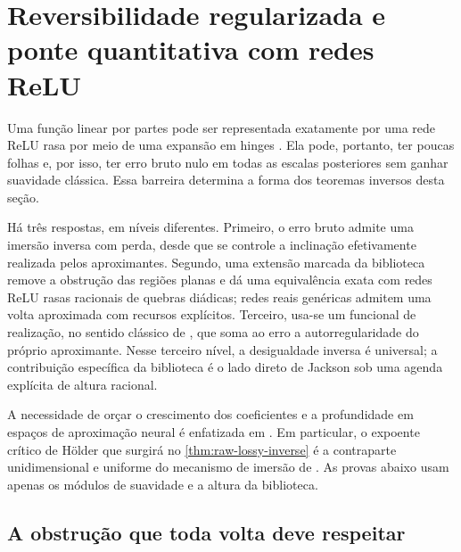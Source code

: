 \section{Reversibilidade regularizada e ponte quantitativa com redes ReLU}
\label{sec:regularized-reversibility}

Uma função linear por partes pode ser representada exatamente por uma rede ReLU
rasa por meio de uma expansão em hinges
\citep{devorehaninpetrova2021,daubechies2022}. Ela pode, portanto, ter poucas
folhas e, por isso, ter erro bruto nulo em todas as escalas posteriores sem
ganhar suavidade clássica. Essa barreira determina a forma dos teoremas
inversos desta seção.

Há três respostas, em níveis diferentes. Primeiro, o erro bruto admite uma
imersão inversa com perda, desde que se controle a inclinação efetivamente
realizada pelos aproximantes. Segundo, uma extensão marcada da biblioteca
remove a obstrução das regiões planas e dá uma equivalência exata com redes
ReLU rasas racionais de quebras diádicas; redes reais genéricas admitem uma
volta aproximada com recursos explícitos. Terceiro, usa-se um funcional de
realização, no sentido clássico de \citet{hristovivanov1990}, que soma ao erro
a autorregularidade do próprio aproximante. Nesse terceiro nível, a
desigualdade inversa é universal; a contribuição específica da biblioteca é o
lado direto de Jackson sob uma agenda explícita de altura racional.

A necessidade de orçar o crescimento dos coeficientes e a profundidade em
espaços de aproximação neural é enfatizada em
\citet{gribonval2022,grohs2023,guhringraslan2021}. Em particular, o expoente crítico de Hölder
que surgirá no \cref{thm:raw-lossy-inverse} é a contraparte unidimensional e
uniforme do mecanismo de imersão de \citet{grohs2023}. As provas abaixo usam
apenas os módulos de suavidade e a altura da biblioteca.

\subsection{A obstrução que toda volta deve respeitar}

